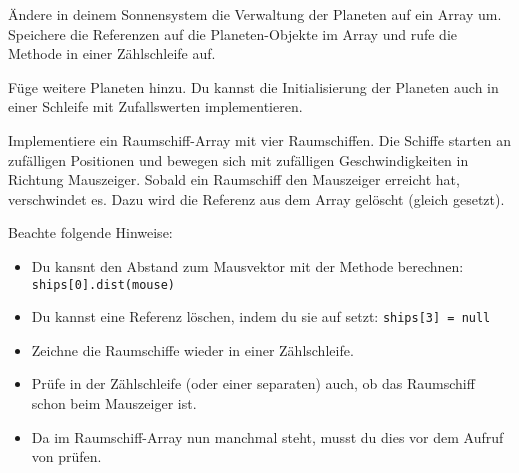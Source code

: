 \documentclass[9pt, a4paper]{arbeitsblatt}
\begin{document}

\begin{aufgabe}[icon=\iconComputer]
\begin{teilaufgaben}
	\teilaufgabe
	Ändere in deinem Sonnensystem die Verwaltung der Planeten auf ein Array um. Speichere die Referenzen auf die Planeten-Objekte im Array und rufe die  Methode in einer Zählschleife auf.

	\teilaufgabe
	Füge weitere Planeten hinzu. Du kannst die Initialisierung der Planeten auch in einer Schleife mit Zufallswerten implementieren.

	\teilaufgabe
	Implementiere ein Raumschiff-Array mit vier Raumschiffen. Die Schiffe starten an zufälligen Positionen und bewegen sich mit zufälligen Geschwindigkeiten in Richtung Mauszeiger. Sobald ein Raumschiff den Mauszeiger erreicht hat, verschwindet es. Dazu wird die Referenz aus dem Array gelöscht (gleich  gesetzt).

	Beachte folgende Hinweise:
	\begin{itemize}
		\item Du kansnt den Abstand zum Mausvektor mit der Methode  berechnen: \texttt{ships[0].dist(mouse)}
		\item Du kannst eine Referenz löschen, indem du sie auf  setzt: \texttt{ships[3] = null}
		\item Zeichne die Raumschiffe wieder in einer Zählschleife.
		\item Prüfe in der Zählschleife (oder einer separaten) auch, ob das Raumschiff schon beim Mauszeiger ist.
		\item Da im Raumschiff-Array nun manchmal  steht, musst du dies vor dem Aufruf von  prüfen.
	\end{itemize}
\end{teilaufgaben}
\end{aufgabe}
\end{document}
